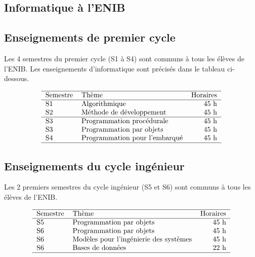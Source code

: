 \newpage
\subsection{Informatique à l'ENIB}\label{annexe:enib}

\subsection*{Enseignements de premier cycle}
Les 4  semestres du premier cycle (S1 à S4) sont communs à
tous les élèves de l'ENIB. Les enseignements d'informatique
sont précisés dans le tableau ci-dessous.

$$\begin{tabular}{llr}
\hline
Semestre & Thème & Horaires \\
\hline
S1 & Algorithmique                 & 45 h \\
S2 & Méthode de développement      & 45 h \\
\hline
S3 & Programmation procédurale     & 45 h \\
S3 & Programmation par objets      & 45 h \\
S4 & Programmation pour l'embarqué & 45 h \\
\hline
\end{tabular}$$


\subsection*{Enseignements du cycle ingénieur}
Les 2 premiers semestres du cycle ingénieur (S5 et S6) sont communs à
tous les élèves de l'ENIB.

$$\begin{tabular}{llr}
\hline
Semestre & Thème & Horaires \\
\hline
S5  & Programmation par objets               & 45 h \\
S6  & Programmation par objets               & 45 h \\
S6  & Modèles pour l'ingénierie des systèmes & 45 h \\
S6  & Bases de données                       & 22 h\\
\hline
\end{tabular}$$

